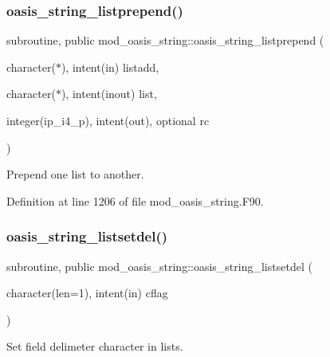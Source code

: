 \mbox{\label{namespacemod__oasis__string_a7df42cce90ae7fa5eceb0b9f2e4bf169}} 
\subsubsection{\texorpdfstring{oasis\+\_\+string\+\_\+listprepend()}{oasis\_string\_listprepend()}}
{\footnotesize\ttfamily subroutine, public mod\+\_\+oasis\+\_\+string\+::oasis\+\_\+string\+\_\+listprepend (\begin{DoxyParamCaption}\item[{character($\ast$), intent(in)}]{listadd,  }\item[{character($\ast$), intent(inout)}]{list,  }\item[{integer(ip\+\_\+i4\+\_\+p), intent(out), optional}]{rc }\end{DoxyParamCaption})}



Prepend one list to another. 



Definition at line 1206 of file mod\+\_\+oasis\+\_\+string.\+F90.

\mbox{\label{namespacemod__oasis__string_a4229e0726d97fc10f17027caea332daf}} 
\subsubsection{\texorpdfstring{oasis\+\_\+string\+\_\+listsetdel()}{oasis\_string\_listsetdel()}}
{\footnotesize\ttfamily subroutine, public mod\+\_\+oasis\+\_\+string\+::oasis\+\_\+string\+\_\+listsetdel (\begin{DoxyParamCaption}\item[{character(len=1), intent(in)}]{cflag }\end{DoxyParamCaption})}



Set field delimeter character in lists. 


